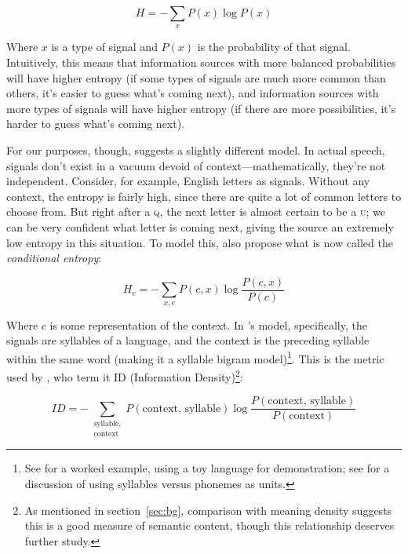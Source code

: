 \documentclass[12pt,twoside]{article}
\begin{document}
\begin{equation}
\label{eqn:shannon}
H = - \sum_x P(x) \log P(x)
\end{equation}

Where \(x\) is a type of signal and \(P(x)\) is the probability of that signal. Intuitively, this means that information sources with more balanced probabilities will have higher entropy (if some types of signals are much more common than others, it's easier to guess what's coming next), and information sources with more types of signals will have higher entropy (if there are more possibilities, it's harder to guess what's coming next).

For our purposes, though, \citet{oh} suggests a slightly different model. In actual speech, signals don't exist in a vacuum devoid of context---mathematically, they're not independent. Consider, for example, English letters as signals. Without any context, the entropy is fairly high, since there are quite a lot of common letters to choose from. But right after a \textsc{q}, the next letter is almost certain to be a \textsc{u}; we can be very confident what letter is coming next, giving the source an extremely low entropy in this situation. To model this, \citet[52]{shannon} also propose what is now called the \emph{conditional entropy}:

\begin{equation}
H_c = - \sum_{x,c} P(c,x) \log \frac{P(c,x)}{P(c)}
\end{equation}

Where \(c\) is some representation of the context. In \citeauthor{oh}'s model, specifically, the signals are syllables of a language, and the context is the preceding syllable within the same word (making it a syllable bigram model)\footnote{See \cite[41]{oh} for a worked example, using a toy language for demonstration; see \cite[545]{pellegrino} for a discussion of using syllables versus phonemes as units.}. This is the metric used by \citet{coupé}, who term it ID (Information Density)\footnote{As mentioned in section~\ref{sec:bg}, comparison with  meaning density suggests this is a good measure of semantic content, though this relationship deserves further study.}:

\begin{equation}
\label{eq:id}
ID = - \sum_{\substack{\textrm{syllable},\\\textrm{context}}} P(\textrm{context, syllable}) \log \frac{P(\textrm{context, syllable})}{P(\textrm{context})}
\end{equation}
\end{document}
